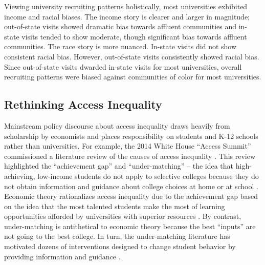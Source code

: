 \documentclass[twoside]{article}
\begin{document}
Viewing university recruiting patterns holistically, most universities exhibited income and racial biases. The income story is clearer and larger in magnitude; out-of-state visits showed dramatic bias towards affluent communities and in-state visits tended to show moderate, though significant bias towards affluent communities. The race story is more nuanced. In-state visits did not show consistent racial bias. However, out-of-state visits consistently showed racial bias. Since out-of-state visits dwarded in-state visits for most universities, overall recruiting patterns were biased against communities of color for most universities.

\subsection*{Rethinking Access Inequality}

Mainstream policy discourse about access inequality draws heavily from scholarship by economists and places responsibility on students and K-12 schools rather than universities. For example, the 2014 White House ``Access Summit'' commissioned a literature review of the causes of access inequality \citep{RN4016}.  This review highlighted the ``achievement gap'' and ``under-matching'' -- the idea that high-achieving, low-income students do not apply to selective colleges because they do not obtain information and guidance about college choices at home or at school \citep{RN3699,RN3700}.  Economic theory rationalizes access inequality due to the achievement gap based on the idea that the most talented students make the most of learning opportunities afforded by universities with superior resources \citep{RN1549,RN2247,RN2402,RN1545}. By contrast, under-matching is antithetical to economic theory because the best ``inputs'' are not going to the best college. In turn, the under-matching literature has motivated dozens of interventions designed to change student behavior by providing information and guidance \citep[e.g.,][]{RN4352,RN4345,RN4351}.
\end{document}
